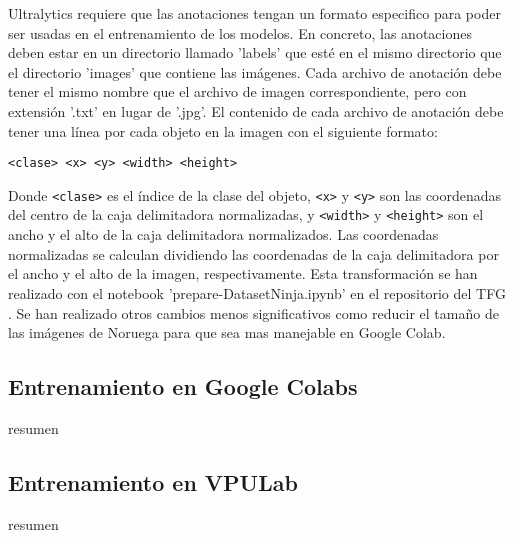 Ultralytics requiere que las anotaciones tengan un formato especifico para poder ser usadas en el entrenamiento de los modelos. En concreto, las anotaciones deben estar en un directorio llamado 'labels' que esté en el mismo directorio que el directorio 'images' que contiene las imágenes. Cada archivo de anotación debe tener el mismo nombre que el archivo de imagen correspondiente, pero con extensión '.txt' en lugar de '.jpg'. El contenido de cada archivo de anotación debe tener una línea por cada objeto en la imagen con el siguiente formato:
\begin{center}
    \texttt{<clase> <x> <y> <width> <height>}
\end{center}
Donde \texttt{<clase>} es el índice de la clase del objeto, \texttt{<x>} y \texttt{<y>} son las coordenadas del centro de la caja delimitadora normalizadas, y \texttt{<width>} y \texttt{<height>} son el ancho y el alto de la caja delimitadora normalizados. Las coordenadas normalizadas se calculan dividiendo las coordenadas de la caja delimitadora por el ancho y el alto de la imagen, respectivamente. Esta transformación se han realizado con el notebook 'prepare-DatasetNinja.ipynb' en el repositorio del TFG \cite{TFG_Repository}. Se han realizado otros cambios menos significativos como reducir el tamaño de las imágenes de Noruega para que sea mas manejable en Google Colab.

\subsection{Entrenamiento en Google Colabs}
resumen

\subsection{Entrenamiento en VPULab}
resumen